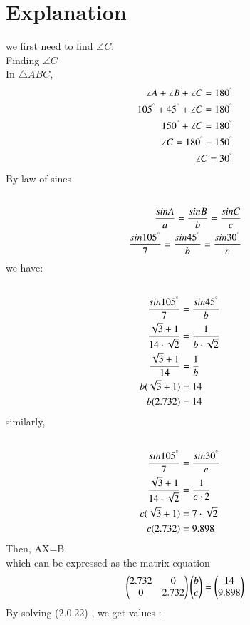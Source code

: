 \documentclass[journal,12pt,twocolumn]{IEEEtran}
\begin{document}
\section{Explanation}
we first need to find $\angle C$:
\\
Finding $\angle C$
\\
In $\triangle ABC$,
\begin{align}
\angle A+\angle B+\angle C = 180^{\degree}
\\
105^{\degree}+45^{\degree}+\angle C = 180^{\degree}
\\
150^{\degree}+\angle C = 180^{\degree}
\\
\angle C = 180^{\degree}-150^{\degree}
\\
\angle C = 30^{\degree}
\\
\end{align}
By law of sines
\begin{align}
\\
\frac{sin A}{a}=\frac{sin B}{b}=\frac{sin C}{c}
\\
\frac{sin 105^{\degree}}{7}=\frac{sin 45^{\degree}}{b}=\frac{sin 30^{\degree}}{c}
\\
\end{align}
we have:
\begin{align}
\\
\frac{sin 105^{\degree}}{7} &=\frac{sin 45^{\degree}}{b}
\\
\frac{\sqrt{3}+1}{14\cdot\sqrt{2}} &=\frac{1}{b\cdot\sqrt{2}}
\\
\frac{\sqrt{3}+1}{14} &=\frac{1}{b}
\\
b(\sqrt{3}+1) &=14
\\
b(2.732) &=14
\end{align}
similarly,
\begin{align}
\\
\frac{sin 105^{\degree}}{7} &=\frac{sin 30^{\degree}}{c}
\\
\frac{\sqrt{3}+1}{14\cdot\sqrt{2}} &=\frac{1}{c\cdot2}
\\
c(\sqrt{3}+1) &={7\cdot\sqrt{2}}
\\
c(2.732) &=9.898
\end{align}
Then, AX=B
\\
which can be expressed as the matrix equation
\begin{align}
\begin{pmatrix}2.732 & 0 \\0& 2.732\end{pmatrix}\begin{pmatrix}b\\c\end{pmatrix} = \begin{pmatrix}14\\9.898\end{pmatrix}
\end{align}
By solving (2.0.22) , we get values :
\end{document}
